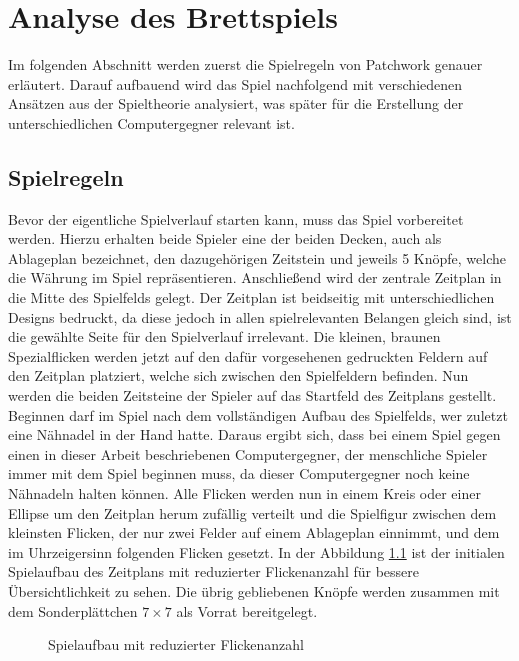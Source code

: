 \chapter{Analyse des Brettspiels}
\label{chapter:analyse-des-bretspiels}

Im folgenden Abschnitt werden zuerst die Spielregeln von Patchwork genauer erläutert. Darauf aufbauend wird das Spiel nachfolgend mit verschiedenen Ansätzen aus der Spieltheorie analysiert, was später für die Erstellung der unterschiedlichen Computergegner relevant ist.

\section{Spielregeln}
\label{section:spielregeln}

Bevor der eigentliche Spielverlauf starten kann, muss das Spiel vorbereitet werden. Hierzu erhalten beide Spieler eine der beiden Decken, auch als Ablageplan bezeichnet, den dazugehörigen Zeitstein und jeweils 5 Knöpfe, welche die Währung im Spiel repräsentieren. Anschließend wird der zentrale Zeitplan in die Mitte des Spielfelds gelegt. Der Zeitplan ist beidseitig mit unterschiedlichen Designs bedruckt, da diese jedoch in allen spielrelevanten Belangen gleich sind, ist die gewählte Seite für den Spielverlauf irrelevant. Die kleinen, braunen Spezialflicken werden jetzt auf den dafür vorgesehenen gedruckten Feldern auf den Zeitplan platziert, welche sich zwischen den Spielfeldern befinden. Nun werden die beiden Zeitsteine der Spieler auf das Startfeld des Zeitplans gestellt. Beginnen darf im Spiel nach dem vollständigen Aufbau des Spielfelds, wer zuletzt eine Nähnadel in der Hand hatte. Daraus ergibt sich, dass bei einem Spiel gegen einen in dieser Arbeit beschriebenen Computergegner, der menschliche Spieler immer mit dem Spiel beginnen muss, da dieser Computergegner noch keine Nähnadeln halten können. Alle Flicken werden nun in einem Kreis oder einer Ellipse um den Zeitplan herum zufällig verteilt und die Spielfigur zwischen dem kleinsten Flicken, der nur zwei Felder auf einem Ablageplan einnimmt, und dem im Uhrzeigersinn folgenden Flicken gesetzt. In der Abbildung \ref{fig:spielaufbau} ist der initialen Spielaufbau des Zeitplans mit reduzierter Flickenanzahl für bessere Übersichtlichkeit zu sehen. Die übrig gebliebenen Knöpfe werden zusammen mit dem Sonderplättchen $7\times7$ als Vorrat bereitgelegt. \cite{2014.PatchworkSpielanleitung}

\begin{figure}[!ht]
    \centering
    \caption{Spielaufbau mit reduzierter Flickenanzahl}
    \label{fig:spielaufbau}
\end{figure}

